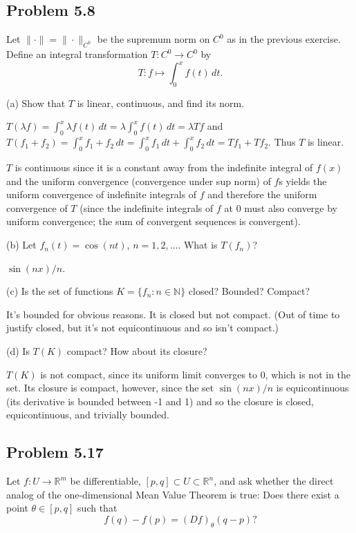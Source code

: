 \documentclass{amsart}
\begin{document}
\newpage

\subsection*{Problem 5.8} Let \( \| \cdot \| = \| \cdot \|_{C^0} \) be the supremum norm on 
\( C^0 \) as in the previous exercise. Define an integral transformation \( T : C^0 \rightarrow C^0 \) by
\[
T : f \mapsto \int_0^x f(t) \, dt.
\]

(a) Show that \( T \) is linear, continuous, and find its norm.

\medskip \noindent $T(\lambda f) = \int_0^x \lambda f(t)\,dt=\lambda\int_0^xf(t)\,dt=\lambda Tf$
and $T(f_1+f_2)=\int_0^xf_1+f_2\,dt=\int_0^xf_1\,dt+\int_0^xf_2\,dt=Tf_1+Tf_2$. Thus $T$ is linear.

\medskip \noindent $T$ is continuous since it is a constant away from the indefinite integral of $f(x)$
and the uniform convergence (convergence under sup norm) of $f$s yields the uniform convergence of indefinite
integrals of $f$ and therefore the uniform convergence of $T$ (since the indefinite integrals of $f$ at $0$ 
must also converge by uniform convergence; the sum of convergent sequences is convergent).

\bigskip

(b) Let \( f_n(t) = \cos(nt) \), \( n = 1, 2, \dots \). What is \( T(f_n) \)?

\medskip \noindent $\sin(nx)/n$. 

(c) Is the set of functions \( K = \{ f_n : n \in \mathbb{N} \} \) closed? Bounded? Compact?

\medskip \noindent It's bounded for obvious reasons. It is closed but not compact. (Out of time to justify closed, but 
it's not equicontinuous and so isn't compact.)

(d) Is \( T(K) \) compact? How about its closure?

\medskip \noindent $T(K)$ is not compact, since its uniform limit converges to 0, which is not in the set.
Its closure is compact, however, since the set $\sin(nx)/n$ is equicontinuous (its derivative is bounded between
-1 and 1) and so the closure is closed, equicontinuous, and trivially bounded.

\newpage

\subsection*{Problem 5.17} Let \( f : U \rightarrow \mathbb{R}^m \) be differentiable, 
\( [p,q] \subset U \subset \mathbb{R}^n \), and ask whether the direct analog of the 
one-dimensional Mean Value Theorem is true: Does there exist a point \( \theta \in [p,q] \) such that
\[
f(q) - f(p) = (Df)_{\theta}(q - p)?
\]
\end{document}
